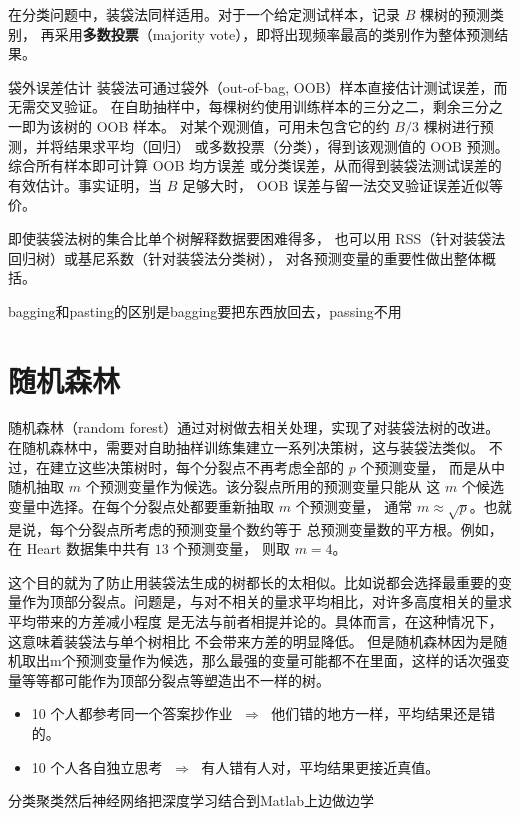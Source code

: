 在分类问题中，装袋法同样适用。对于一个给定测试样本，记录 $B$ 棵树的预测类别，
再采用\textbf{多数投票}（majority vote），即将出现频率最高的类别作为整体预测结果。
\begin{definition}{袋外误差估计}
装袋法可通过袋外（out-of-bag, OOB）样本直接估计测试误差，而无需交叉验证。
在自助抽样中，每棵树约使用训练样本的三分之二，剩余三分之一即为该树的 OOB 样本。
对某个观测值，可用未包含它的约 $B/3$ 棵树进行预测，并将结果求平均（回归）
或多数投票（分类），得到该观测值的 OOB 预测。综合所有样本即可计算 OOB 均方误差
或分类误差，从而得到装袋法测试误差的有效估计。事实证明，当 $B$ 足够大时，
OOB 误差与留一法交叉验证误差近似等价。
\end{definition}
即使装袋法树的集合比单个树解释数据要困难得多，
也可以用 RSS（针对装袋法回归树）或基尼系数（针对装袋法分类树），
对各预测变量的重要性做出整体概括。
\begin{dxtips}
    bagging和pasting的区别是bagging要把东西放回去，passing不用
\end{dxtips}
\section{随机森林}
\begin{definition}[随机森林]
    随机森林（random forest）通过对树做去相关处理，实现了对装袋法树的改进。
在随机森林中，需要对自助抽样训练集建立一系列决策树，这与装袋法类似。
不过，在建立这些决策树时，每个分裂点不再考虑全部的 $p$ 个预测变量，
而是从中随机抽取 $m$ 个预测变量作为候选。该分裂点所用的预测变量只能从
这 $m$ 个候选变量中选择。在每个分裂点处都要重新抽取 $m$ 个预测变量，
通常 $m \approx \sqrt{p}$。也就是说，每个分裂点所考虑的预测变量个数约等于
总预测变量数的平方根。例如，在 Heart 数据集中共有 $13$ 个预测变量，
则取 $m=4$。
\end{definition}
这个目的就为了防止用装袋法生成的树都长的太相似。比如说都会选择最重要的变量作为顶部分裂点。问题是，与对不相关的量求平均相比，对许多高度相关的量求平均带来的方差减小程度
是无法与前者相提并论的。具体而言，在这种情况下，这意味着装袋法与单个树相比
不会带来方差的明显降低。
但是随机森林因为是随机取出m个预测变量作为候选，那么最强的变量可能都不在里面，这样的话次强变量等等都可能作为顶部分裂点等塑造出不一样的树。
\begin{itemize}
  \item 10 个人都参考同一个答案抄作业 $\;\Rightarrow\;$ 他们错的地方一样，平均结果还是错的。
  \item 10 个人各自独立思考 $\;\Rightarrow\;$ 有人错有人对，平均结果更接近真值。
\end{itemize}
分类聚类然后神经网络把深度学习结合到Matlab上边做边学

